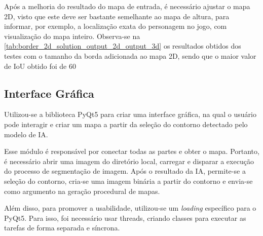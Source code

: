 

Após a melhoria do resultado do mapa de entrada, é necessário ajustar o mapa 2D, visto que este deve ser bastante semelhante ao mapa de altura, para informar, por exemplo, a localização exata do personagem no jogo, com visualização do mapa inteiro. Observa-se na \cref{tab:border_2d_solution_output_2d_output_3d} os resultados obtidos dos testes com o tamanho da borda adicionada ao mapa 2D, sendo que o maior valor de IoU obtido foi de 60%



\subsection{Interface Gráfica}

Utilizou-se a biblioteca PyQt5 para criar uma interface gráfica, na qual o usuário pode interagir e criar um mapa a partir da seleção do contorno detectado pelo modelo de IA.

Esse módulo é responsável por conectar todas as partes e obter o mapa. Portanto, é necessário abrir uma imagem do diretório local, carregar e disparar a execução do processo de segmentação de imagem. Após o resultado da IA, permite-se a seleção do contorno, cria-se uma imagem binária a partir do contorno e envia-se como argumento na geração procedural de mapas.

Além disso, para promover a usabilidade, utilizou-se um \textit{loading} específico para o PyQt5. Para isso, foi necessário usar threads, criando classes para executar as tarefas de forma separada e síncrona.